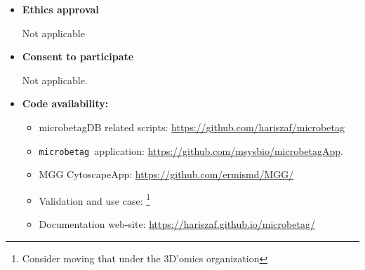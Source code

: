 \documentclass[sn-mathphys,Numbered]{sn-jnl}  %
\theoremstyle{thmstyleone}%
\theoremstyle{thmstyletwo}%
\theoremstyle{thmstylethree}%
\newcommand{\microbetag}{\texttt{microbetag }}
\begin{document}
\begin{itemize}
        \item \textbf{Ethics approval}

            Not applicable

        \item \textbf{Consent to participate}
        
            Not applicable.

        \item \textbf{Code availability: }

            \begin{itemize}
                \item microbetagDB related scripts: \href{https://github.com/hariszaf/microbetag}{https://github.com/hariszaf/microbetag}
                \item \microbetag application: \href{https://github.com/msysbio/microbetagApp}{https://github.com/msysbio/microbetagApp}.
                \item MGG CytoscapeApp: \href{https://github.com/ermismd/MGG/}{https://github.com/ermismd/MGG/}
                \item Validation and use case: \footnote{Consider moving that under the 3D'omics organization}
                \item Documentation web-site: \href{https://hariszaf.github.io/microbetag/}{https://hariszaf.github.io/microbetag/}
            \end{itemize}

    \end{itemize}
\end{document}
